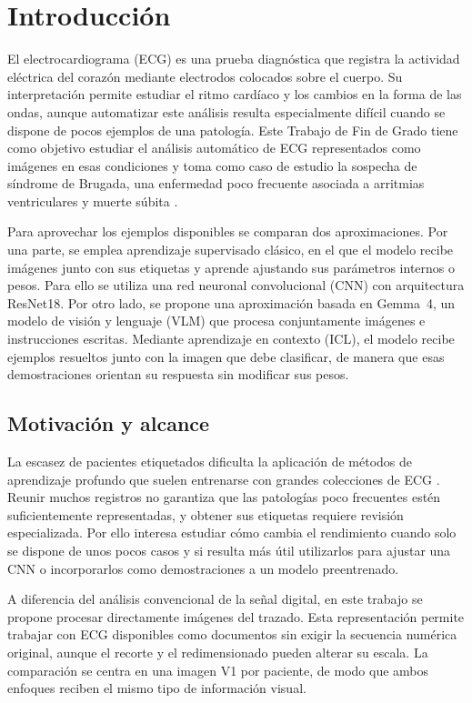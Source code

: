 \chapter{Introducción}
\label{chap:introduccion}

El electrocardiograma (ECG) es una prueba diagnóstica que registra la actividad eléctrica del corazón mediante electrodos colocados sobre el cuerpo. Su interpretación permite estudiar el ritmo cardíaco y los cambios en la forma de las ondas, aunque automatizar este análisis resulta especialmente difícil cuando se dispone de pocos ejemplos de una patología. Este Trabajo de Fin de Grado tiene como objetivo estudiar el análisis automático de ECG representados como imágenes en esas condiciones y toma como caso de estudio la sospecha de síndrome de Brugada, una enfermedad poco frecuente asociada a arritmias ventriculares y muerte súbita \cite{zeppenfeld2022,wilde2023scbt}.

Para aprovechar los ejemplos disponibles se comparan dos aproximaciones. Por una parte, se emplea aprendizaje supervisado clásico, en el que el modelo recibe imágenes junto con sus etiquetas y aprende ajustando sus parámetros internos o pesos. Para ello se utiliza una red neuronal convolucional (CNN) con arquitectura ResNet18. Por otro lado, se propone una aproximación basada en Gemma~4, un modelo de visión y lenguaje (VLM) que procesa conjuntamente imágenes e instrucciones escritas. Mediante aprendizaje en contexto (ICL), el modelo recibe ejemplos resueltos junto con la imagen que debe clasificar, de manera que esas demostraciones orientan su respuesta sin modificar sus pesos.

\section{Motivación y alcance}

La escasez de pacientes etiquetados dificulta la aplicación de métodos de aprendizaje profundo que suelen entrenarse con grandes colecciones de ECG \cite{ribeiro2020,sangha2022}. Reunir muchos registros no garantiza que las patologías poco frecuentes estén suficientemente representadas, y obtener sus etiquetas requiere revisión especializada. Por ello interesa estudiar cómo cambia el rendimiento cuando solo se dispone de unos pocos casos y si resulta más útil utilizarlos para ajustar una CNN o incorporarlos como demostraciones a un modelo preentrenado.

A diferencia del análisis convencional de la señal digital, en este trabajo se propone procesar directamente imágenes del trazado. Esta representación permite trabajar con ECG disponibles como documentos sin exigir la secuencia numérica original, aunque el recorte y el redimensionado pueden alterar su escala. La comparación se centra en una imagen V1 por paciente, de modo que ambos enfoques reciben el mismo tipo de información visual.

